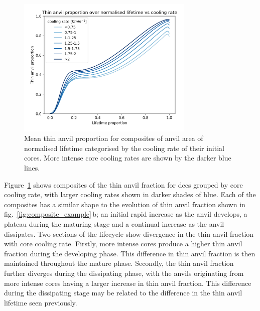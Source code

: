 \begin{figure}[tp]
    \centering
    \includegraphics[width=0.75\textwidth]{figures/chapter3_13.png}
    \caption[
    Mean thin anvil proportion for composites of anvil area of normalised lifetime categorised by the cooling rate of their initial cores.
    ]{
    Mean thin anvil proportion for composites of anvil area of normalised lifetime categorised by the cooling rate of their initial cores. More intense core cooling rates are shown by the darker blue lines.
    }
    \label{fig:cooling_rate_composite}
\end{figure}


Figure~\ref{fig:cooling_rate_composite} shows composites of the thin anvil fraction for \acrshort{dcc}s grouped by core cooling rate, with larger cooling rates shown in darker shades of blue.
Each of the composites has a similar shape to the evolution of thin anvil fraction shown in fig.~\ref{fig:composite_example}\,b; an initial rapid increase as the anvil develops, a plateau during the maturing stage and a continual increase as the anvil dissipates.
Two sections of the lifecycle show divergence in the thin anvil fraction with core cooling rate.
Firstly, more intense cores produce a higher thin anvil fraction during the developing phase.
This difference in thin anvil fraction is then maintained throughout the mature phase.
Secondly, the thin anvil fraction further diverges during the dissipating phase, with the anvils originating from more intense cores having a larger increase in thin anvil fraction.
This difference during the dissipating stage may be related to the difference in the thin anvil lifetime seen previously.


